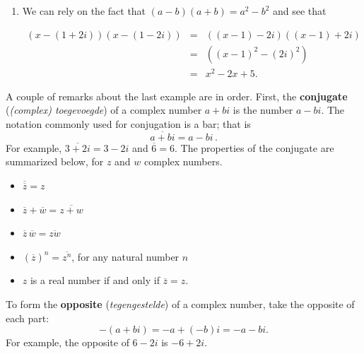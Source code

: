 \begin{example}
\begin{enumerate}
		
		\item  We can rely on the fact that $(a-b)(a+b)=a^2-b^2$ and see that 
		
		\[\begin{array}{rclr} \left(x-(1+2i)\right)\left(x-(1-2i)\right) & = &  \left((x-1)-2i\right)\left((x-1)+2i\right) & \\
		
		&	= & \left((x-1)^2-(2i)^2\right) & \\ 
		& =  & x^2 -2x +5. & \end{array}\]
		
	\end{enumerate}
	
	
\end{example}

A couple of remarks about the last example are in order.  First, the \textbf{conjugate} (\textit{(complex) toegevoegde}) of a complex number $a+bi$ is the number $a-bi$.  The notation commonly used for conjugation is a bar; that is
$$\overline{a+bi} = a-bi\,.$$
For example, $\overline{3+2i} = 3-2i$ and $\overline{6} = 6$.  The properties of the conjugate are summarized below, for $z$ and $w$ complex numbers. 

\begin{itemize}
	
	\item  $\overline{\overline{z}} = z$
	
	\item  $ \overline{z} + \overline{w}  = \overline{z+w}$
	
	\item  $ \overline{z} \, \overline{w}  = \overline{zw}$
	
	\item  $\left(\overline{z}\right)^n = \overline{z^{n}}$, for any natural number $n$
	
	\item  $z$ is a real number if and only if $\overline{z} = z$.
	
\end{itemize}


To form the \textbf{opposite} (\textit{tegengestelde}) of a complex number, take the opposite of each part: 
\[-(a + bi) = -a + (-b)i = -a - bi.\]
For example, the opposite of $6 - 2i$ is $-6 + 2i$. \\





